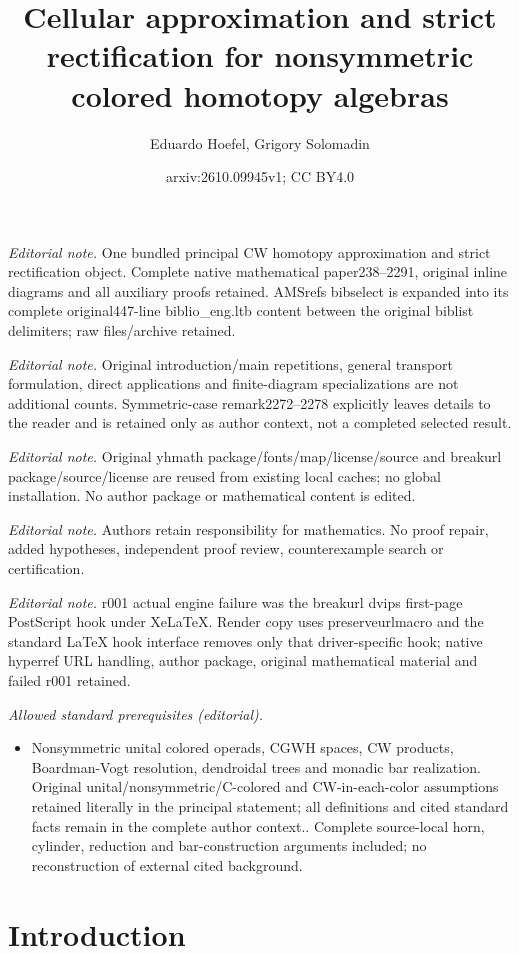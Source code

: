 \documentclass{amsart}
\title{Cellular approximation and strict rectification for nonsymmetric colored homotopy algebras}
\author{Eduardo Hoefel, Grigory Solomadin}
\date{arxiv:2610.09945v1; CC BY4.0}
\theoremstyle{definition}
\theoremstyle{remark}
\begin{document}
\maketitle
\noindent\textit{Editorial note.} One bundled principal CW homotopy approximation and strict rectification object. Complete native mathematical paper238--2291, original inline diagrams and all auxiliary proofs retained. AMSrefs bibselect is expanded into its complete original447-line biblio\_eng.ltb content between the original biblist delimiters; raw files/archive retained.\par\medskip
\noindent\textit{Editorial note.} Original introduction/main repetitions, general transport formulation, direct applications and finite-diagram specializations are not additional counts. Symmetric-case remark2272--2278 explicitly leaves details to the reader and is retained only as author context, not a completed selected result.\par\medskip
\noindent\textit{Editorial note.} Original yhmath package/fonts/map/license/source and breakurl package/source/license are reused from existing local caches; no global installation. No author package or mathematical content is edited.\par\medskip
\noindent\textit{Editorial note.} Authors retain responsibility for mathematics. No proof repair, added hypotheses, independent proof review, counterexample search or certification.\par\medskip
\noindent\textit{Editorial note.} r001 actual engine failure was the breakurl dvips first-page PostScript hook under XeLaTeX. Render copy uses preserveurlmacro and the standard LaTeX hook interface removes only that driver-specific hook; native hyperref URL handling, author package, original mathematical material and failed r001 retained.\par\medskip
\noindent\textit{Allowed standard prerequisites (editorial).}\begin{itemize}
\item Nonsymmetric unital colored operads, CGWH spaces, CW products, Boardman-Vogt resolution, dendroidal trees and monadic bar realization. Original unital/nonsymmetric/C-colored and CW-in-each-color assumptions retained literally in the principal statement; all definitions and cited standard facts remain in the complete author context.. Complete source-local horn, cylinder, reduction and bar-construction arguments included; no reconstruction of external cited background.
\end{itemize}\medskip
	\section{Introduction}\label{sec:intro}
	
\end{document}
